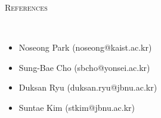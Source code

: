 \documentclass[10pt]{article}
\newenvironment{changemargin}[2]{
  \begin{list}{}{
    \setlength{\topsep}{0pt}
    \setlength{\leftmargin}{#1}
    \setlength{\rightmargin}{#2}
    \setlength{\listparindent}{\parindent}
    \setlength{\itemindent}{\parindent}
    \setlength{\parsep}{\parskip}
  }
  \item[]}{\end{list}
}
\newcommand{\lineover}{
	\begin{changemargin}{-0.05in}{-0.05in}
		\vspace*{-8pt}
		\hrulefill \\
		\vspace*{-2pt}
	\end{changemargin}
}
\newcommand{\header}[1]{
	\begin{changemargin}{-0.5in}{-0.5in}
		\scshape{#1}\\
  	\lineover
	\end{changemargin}
}
\newcommand{\labdescription}[1]{
	\begin{changemargin}{0.15in}{0.15in}
    \smallskip
		{#1}
    \medskip
	\end{changemargin}
}
\newcommand{\labtitle}[3]{
	\textbf{#1}, \emph{#2} \hfill \emph{#3}\\
}
\newenvironment{body} {
	\vspace*{-16pt}
	\begin{changemargin}{-0.25in}{-0.5in}
  }
	{\end{changemargin}
}
\begin{document}
\medskip

\header{References}

\begin{body}
	\vspace{14pt}
    \begin{itemize}
        \item Noseong Park  (noseong@kaist.ac.kr)
        \item Sung-Bae Cho  (sbcho@yonsei.ac.kr)
        \item Duksan Ryu (duksan.ryu@jbnu.ac.kr)
        \item Suntae Kim (stkim@jbnu.ac.kr)
    \end{itemize}
\end{body}



  

  
\end{document}
